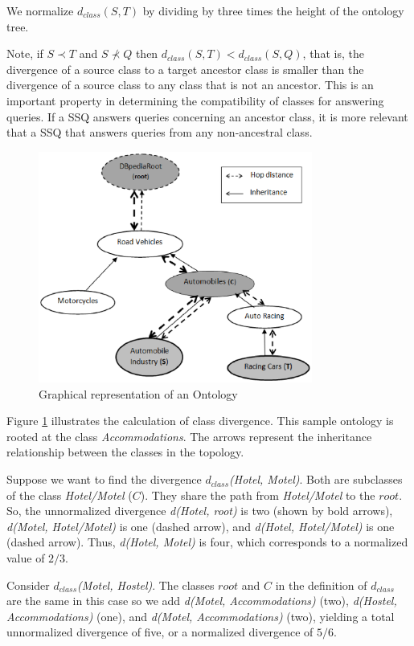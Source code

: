 \documentclass{www2010-submission}
\begin{document}
We normalize $d_{class}(S, T)$ by dividing by three times the height of the ontology tree.

Note, if $S \prec T$ and $S \not\prec Q$ then $d_{class}(S,T) < d_{class}(S,Q)$,
that is, the divergence of a source class to a target ancestor class is smaller than the divergence of a source class to any class that is not an ancestor. This is an important property in determining the compatibility of classes for answering queries.  If a SSQ answers queries concerning an ancestor class, it is more relevant that a SSQ that answers queries from any non-ancestral class. 

\begin{figure}[t]
\centering
\includegraphics[width=90mm]{class_divergence.eps}
\caption{Graphical representation of an Ontology}
\label{fig:class_divergence}
\end{figure}

Figure \ref{fig:class_divergence} illustrates the calculation of class divergence. This sample ontology is rooted at the class \textit{Accommodations}. The arrows represent the inheritance relationship between the classes in the topology.

Suppose we want to find the divergence $d_{class}$\textit{(Hotel, Motel)}. Both are subclasses of the class \textit{Hotel/Motel} ($C$). They share the path from \textit{Hotel/Motel} to the $root$. So, the unnormalized divergence \textit{d(Hotel, root)} is two (shown by bold arrows), \textit{d(Motel, Hotel/Motel)} is one (dashed arrow), and \textit{d(Hotel, Hotel/Motel)} is one (dashed arrow). Thus, \textit{d(Hotel, Motel)} is four, which corresponds to a normalized value of $2/3$. 

Consider $d_{class}$\textit{(Motel, Hostel)}. The classes $root$ and $C$ in the definition of $d_{class}$ are the same in this case so we add \textit{d(Motel, Accommodations)} (two), \textit{d(Hostel, Accommodations)} (one), and \textit{d(Motel, Accommodations)} (two), yielding a total unnormalized divergence of five, or a normalized divergence of $5/6$.
\end{document}
